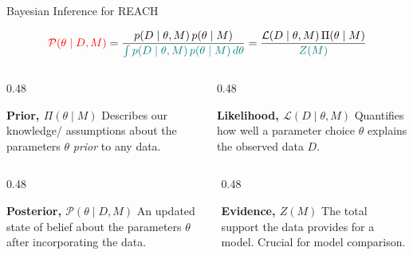 \documentclass{beamer}
\begin{document}
\begin{frame}{Bayesian Inference for REACH}

\centering
\vspace{-2em}
\begingroup
\color{black}
\[
\textcolor{red}{\mathcal{P}(\theta \mid D, M)}
=
\frac{p(D \mid \theta, M)\, p(\theta \mid M)}{
\textcolor{teal}{\int p(D \mid \theta, M)\, p(\theta \mid M)\, d\theta
}}
=
\frac{\mathcal{L}(D \mid \theta, M)\, \Pi(\theta \mid M)}{\textcolor{teal}{Z(M)}}
\]
\endgroup

\small
\begin{columns}[T,totalwidth=\textwidth]

\begin{column}{0.48\textwidth}
\begin{block}{\textbf{Prior, $\Pi(\theta \mid M)$}}
Describes our knowledge/ assumptions about the parameters  
\(\theta\) \textit{prior} to any data.
\end{block}
\end{column}

\begin{column}{0.48\textwidth}
\begin{block}{\textbf{Likelihood, $\mathcal{L}(D \mid \theta, M)$}}
Quantifies how well a parameter choice \(\theta\) explains  
the observed data \(D\).
\end{block}
\end{column}

\end{columns}

\vspace{0.7em}

\begin{columns}[T,totalwidth=\textwidth]

\begin{column}{0.48\textwidth}
{

\begin{block}{\textbf{Posterior, $\mathcal{P}(\theta \mid D, M)$}}
An updated state of belief about the parameters \(\theta\) after incorporating the data.
\end{block}
}
\end{column}

\begin{column}{0.48\textwidth}
{

\begin{block}{\textbf{Evidence, $Z(M)$}}
The total support the data provides for a model. Crucial for model comparison.
\end{block}
}
\end{column}

\end{columns}
\end{frame}
\end{document}
